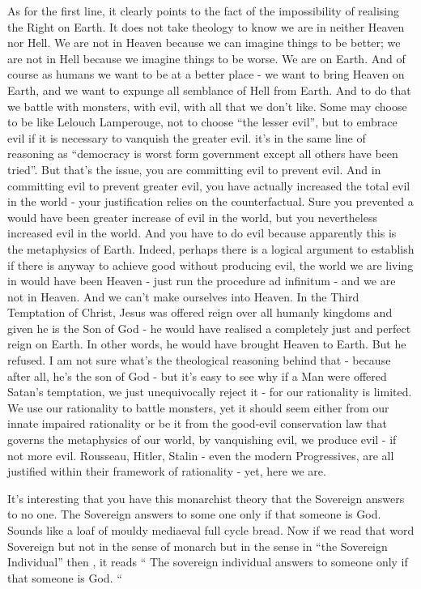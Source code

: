 As for the first line, it clearly points to the fact of the impossibility of realising the Right on Earth. It does not take theology to know we are in neither Heaven nor Hell. We are not in Heaven because we can imagine things to be better; we are not in Hell because we imagine things to be worse. We are on Earth. And of course as humans we want to be at a better place - we want to bring Heaven on Earth, and we want to expunge all semblance of Hell from Earth. And to do that we battle with monsters, with evil, with all that we don’t like. Some may choose to be like Lelouch Lamperouge, not to choose “the lesser evil”, but to embrace evil if it is necessary to vanquish the greater evil. it’s in the same line of reasoning as “democracy is worst form government except all others have been tried”. But that’s the issue, you are committing evil to prevent evil. And in committing evil to prevent greater evil, you have actually increased the total evil in the world - your justification relies on the counterfactual. Sure you prevented a would have been greater increase of evil in the world, but you nevertheless increased evil in the world. And you have to do evil because apparently this is the metaphysics of Earth. Indeed, perhaps there is a logical argument to establish if there is anyway to achieve good without producing evil, the world we are living in would have been Heaven - just run the procedure ad infinitum - and we are not in Heaven. And we can’t make ourselves into Heaven. In the Third Temptation of Christ, Jesus was offered reign over all humanly kingdoms and given he is the Son of God - he would have realised a completely just and perfect reign on Earth. In other words, he would have brought Heaven to Earth. But he refused. I am not sure what’s the theological reasoning behind that - because after all, he’s the son of God - but it’s easy to see why if a Man were offered Satan’s temptation, we just unequivocally reject it - for our rationality is limited. We use our rationality to battle monsters, yet it should seem either from our innate impaired rationality or be it from the good-evil conservation law that governs the metaphysics of our world, by vanquishing evil, we produce evil - if not more evil. Rousseau, Hitler, Stalin - even the modern Progressives, are all justified within their framework of rationality - yet, here we are. 




It’s interesting that you have this monarchist theory that the Sovereign answers to no one. The Sovereign answers to some one only if that someone is God. Sounds like a loaf of mouldy mediaeval full cycle bread. Now if we read that word Sovereign but not in the sense of monarch but in the sense in “the Sovereign Individual”  then , it reads “ The sovereign individual answers to someone only if that someone is God. “ 


